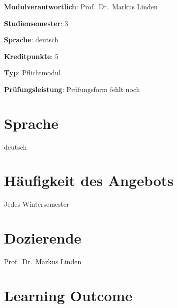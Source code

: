 \begin{modulHead}
\textbf{Modulverantwortlich}: Prof.~Dr.~Markus
Linden
\end{modulHead}
\begin{modulHead}
\textbf{Studiensemester}:
3
\end{modulHead}
\begin{modulHead}
\textbf{Sprache}:
deutsch
\end{modulHead}
\begin{modulHead}
\textbf{Kreditpunkte}:
5
\end{modulHead}
\begin{modulHead}
\textbf{Typ}:
Pflichtmodul
\end{modulHead}
\begin{modulHead}
\textbf{Prüfungsleistung}:
Prüfungsform fehlt noch
\end{modulHead}


\hypertarget{sprachepathlabel....srcmodulbeschreibungen-bachelor-bpo5ba_product-dimensions}{%
\section*{Sprache\label{../../src/modulbeschreibungen-bachelor-bpo5/BA_Product-Dimensions}}\label{sprachepathlabel....srcmodulbeschreibungen-bachelor-bpo5ba_product-dimensions}}

deutsch

\hypertarget{huxe4ufigkeit-des-angebotspathlabel....srcmodulbeschreibungen-bachelor-bpo5ba_product-dimensions}{%
\section*{Häufigkeit des
Angebots\label{../../src/modulbeschreibungen-bachelor-bpo5/BA_Product-Dimensions}}\label{huxe4ufigkeit-des-angebotspathlabel....srcmodulbeschreibungen-bachelor-bpo5ba_product-dimensions}}

Jedes Wintersemester

\hypertarget{dozierendepathlabel....srcmodulbeschreibungen-bachelor-bpo5ba_product-dimensions}{%
\section*{Dozierende\label{../../src/modulbeschreibungen-bachelor-bpo5/BA_Product-Dimensions}}\label{dozierendepathlabel....srcmodulbeschreibungen-bachelor-bpo5ba_product-dimensions}}

Prof.~Dr.~Markus Linden

\hypertarget{learning-outcomepathlabel....srcmodulbeschreibungen-bachelor-bpo5ba_product-dimensions}{%
\section*{Learning
Outcome\label{../../src/modulbeschreibungen-bachelor-bpo5/BA_Product-Dimensions}}\label{learning-outcomepathlabel....srcmodulbeschreibungen-bachelor-bpo5ba_product-dimensions}}

